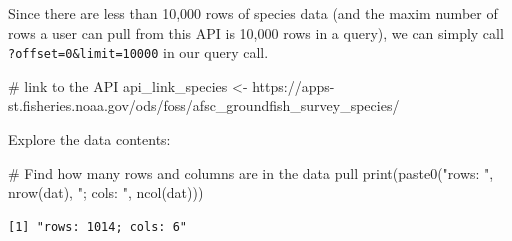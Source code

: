 \documentclass[
  letterpaper,
  oneside,
  open=any]{scrbook}
\newenvironment{Shaded}{\begin{snugshade}}{\end{snugshade}}
\newcommand{\AttributeTok}[1]{\textcolor[rgb]{0.40,0.45,0.13}{#1}}
\newcommand{\CommentTok}[1]{\textcolor[rgb]{0.37,0.37,0.37}{#1}}
\newcommand{\DocumentationTok}[1]{\textcolor[rgb]{0.37,0.37,0.37}{\textit{#1}}}
\newcommand{\FunctionTok}[1]{\textcolor[rgb]{0.28,0.35,0.67}{#1}}
\newcommand{\NormalTok}[1]{\textcolor[rgb]{0.00,0.23,0.31}{#1}}
\newcommand{\OtherTok}[1]{\textcolor[rgb]{0.00,0.23,0.31}{#1}}
\newcommand{\SpecialCharTok}[1]{\textcolor[rgb]{0.37,0.37,0.37}{#1}}
\newcommand{\StringTok}[1]{\textcolor[rgb]{0.13,0.47,0.30}{#1}}
\begin{document}
Since there are less than 10,000 rows of species data (and the maxim
number of rows a user can pull from this API is 10,000 rows in a query),
we can simply call \texttt{?offset=0\&limit=10000} in our query call.

\begin{Shaded}
\begin{Highlighting}[]
\CommentTok{\# link to the API}
\NormalTok{api\_link\_species }\OtherTok{\textless{}{-}} \StringTok{\textquotesingle{}https://apps{-}st.fisheries.noaa.gov/ods/foss/afsc\_groundfish\_survey\_species/\textquotesingle{}}
\end{Highlighting}
\end{Shaded}

\begin{Shaded}
\end{Shaded}

Explore the data contents:

\begin{Shaded}
\begin{Highlighting}[]
\CommentTok{\# Find how many rows and columns are in the data pull}
\FunctionTok{print}\NormalTok{(}\FunctionTok{paste0}\NormalTok{(}\StringTok{"rows: "}\NormalTok{, }\FunctionTok{nrow}\NormalTok{(dat), }\StringTok{"; cols: "}\NormalTok{, }\FunctionTok{ncol}\NormalTok{(dat)))}
\end{Highlighting}
\end{Shaded}

\begin{verbatim}
[1] "rows: 1014; cols: 6"
\end{verbatim}
\end{document}
